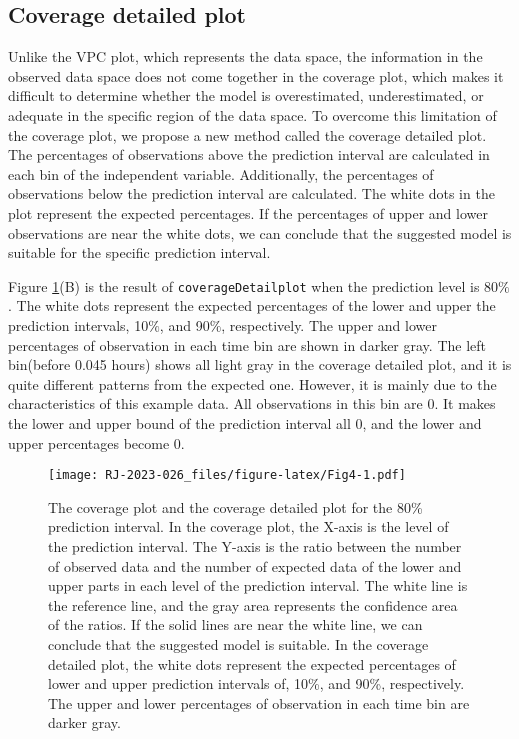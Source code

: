 \hypertarget{coverage-detailed-plot}{%
\subsection{Coverage detailed plot}\label{coverage-detailed-plot}}

Unlike the VPC plot, which represents the data space, the information in the observed data space does not come together in the coverage plot, which makes it difficult to determine whether the model is overestimated, underestimated, or adequate in the specific region of the data space. To overcome this limitation of the coverage plot, we propose a new method called the coverage detailed plot.
The percentages of observations above the prediction interval are calculated in each bin of the independent variable. Additionally, the percentages of observations below the prediction interval are calculated. The white dots in the plot represent the expected percentages. If the percentages of upper and lower observations are near the white dots, we can conclude that the suggested model is suitable for the specific prediction interval.

Figure \ref{fig:Fig4}(B) is the result of \texttt{coverageDetailplot} when the prediction level is 80\(\%\). The white dots represent the expected percentages of the lower and upper the prediction intervals, 10\(\%\), and 90\(\%\), respectively. The upper and lower percentages of observation in each time bin are shown in darker gray. The left bin(before 0.045 hours) shows all light gray in the coverage detailed plot, and it is quite different patterns from the expected one. However, it is mainly due to the characteristics of this example data. All observations in this bin are 0. It makes the lower and upper bound of the prediction interval all 0, and the lower and upper percentages become 0.

\begin{figure}
\centering
\texttt{[image: RJ-2023-026\_files/figure-latex/Fig4-1.pdf]}
\caption{\label{fig:Fig4}The coverage plot and the coverage detailed plot for the 80\% prediction interval. In the coverage plot, the X-axis is the level of the prediction interval. The Y-axis is the ratio between the number of observed data and the number of expected data of the lower and upper parts in each level of the prediction interval. The white line is the reference line, and the gray area represents the confidence area of the ratios. If the solid lines are near the white line, we can conclude that the suggested model is suitable. In the coverage detailed plot, the white dots represent the expected percentages of lower and upper prediction intervals of, 10\%, and 90\%, respectively. The upper and lower percentages of observation in each time bin are darker gray.}
\end{figure}

